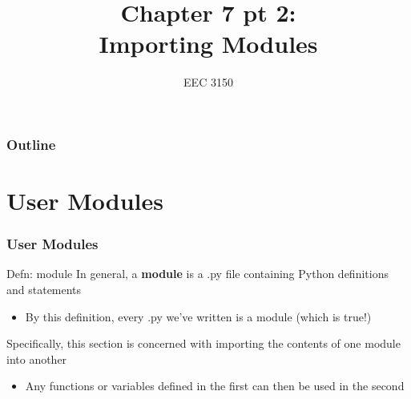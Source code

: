 \documentclass{beamer}
\title{Chapter 7 pt 2: \\ Importing Modules}
\author{EEC 3150}
\date{}
\institute{Trevecca Nazarene University}
\begin{document}
\frame{\titlepage}
 
\begin{frame}	
	\frametitle{Outline}
	\tableofcontents	
\end{frame}


\section{User Modules}

\begin{frame}	
\end{frame}

\begin{frame}	
	\frametitle{User Modules}
	
	\begin{alertblock}{Defn: module}
		In general, a \textbf{module} is a .py file containing Python definitions and statements
		\begin{itemize}
			\item By this definition, every .py we've written is a module (which is true!)
		\end{itemize}
		Specifically, this section is concerned with importing the contents of one module into another
		\begin{itemize}
			\item Any functions or variables defined in the first can then be used in the second
		\end{itemize}
	\end{alertblock}
	
\end{frame}
\end{document}
